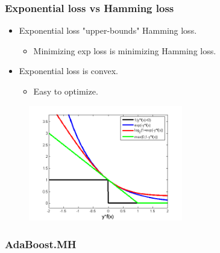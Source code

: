 \documentclass{beamer}
\begin{document}
\begin{frame}
\frametitle{Exponential loss vs Hamming loss}
\begin{itemize}
\item Exponential loss "upper-bounds" Hamming loss.
  \begin{itemize}
    \item Minimizing exp loss is minimizing Hamming loss.
  \end{itemize}
\item Exponential loss is convex.
  \begin{itemize}
    \item Easy to optimize.
  \end{itemize}
\end{itemize}

\begin{figure}
\includegraphics[width=0.6\textwidth]{img/convex-bounds.png}
\end{figure}

\end{frame}

\begin{frame}
\frametitle{AdaBoost.MH}
\begin{algorithm}[H]
\end{algorithm}
\end{frame}
\end{document}
